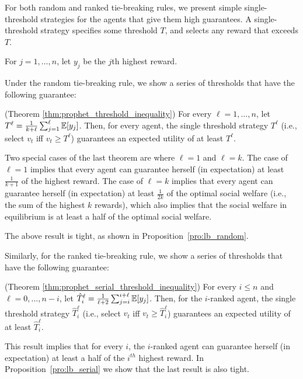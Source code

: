 
For both random and ranked tie-breaking rules, we present simple single-threshold strategies for the agents that give them high guarantees. 
A single-threshold strategy specifies some threshold $T$, and selects any reward that exceeds $T$.

For $j=1, \ldots, n$, let $y_j$ be the $j$th highest reward. 

Under the random tie-breaking rule, we show a series of thresholds that have the following guarantee:

\begin{theorem*}(Theorem \ref{thm:prophet_threshold_inequality})
	For every $\ell=1, \ldots, n$, let $T^\ell = \frac{1}{k+\ell}\sum_{j=1}^{\ell} \mathbb{E} [y_j]$. 
	Then, for every agent, the single threshold strategy $T^{\ell}$ (i.e., select $v_t$ iff $v_t\geq T^\ell$) guarantees an expected utility of at least $T^{\ell}$.
\end{theorem*}

Two special cases of the last theorem are where $\ell=1$ and $\ell=k$. 
The case of $\ell=1$ implies that every agent can guarantee herself (in expectation) at least $\frac{1}{k+1}$ of the highest reward. 
The case of $\ell=k$ implies that every agent can guarantee herself (in expectation) at least $\frac{1}{2k}$ of the optimal social welfare (i.e., the sum of the highest $k$ rewards), which also implies that the social welfare in equilibrium is at least a half of the optimal social welfare. 

The above result is tight, as shown in Proposition~\ref{pro:lb_random}.

Similarly, for the ranked tie-breaking rule, we show a series of thresholds that have the following guarantee:
\begin{theorem*}(Theorem \ref{thm:prophet_serial_threshold_inequality})
	For every $i\leq n$ and $\ell=0, \ldots, n-i$, let $\hat{T}_i^\ell=\frac{1}{\ell+2}\sum_{j=i}^{i+\ell} \mathbb{E} [y_j]$. 
Then, for the $i$-ranked agent, the single threshold strategy $\hat{T}_i^\ell$ (i.e., select $v_t$ iff $v_t\geq \hat{T}_i^\ell$) guarantees an expected utility of at least $\hat{T}_i^\ell$.
\end{theorem*}

This result implies that for every $i$, the $i$-ranked agent can guarantee herself (in expectation) at least a half of the $i^{th}$ highest reward.
In Proposition~\ref{pro:lb_serial} we show that the last result is also tight.


